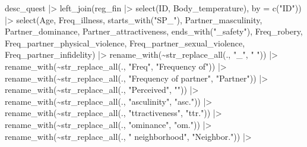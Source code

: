 \documentclass[
  bookmarksnumbered]{article}
\newenvironment{Shaded}{\begin{snugshade}}{\end{snugshade}}
\newcommand{\AttributeTok}[1]{\textcolor[rgb]{0.80,0.80,0.80}{#1}}
\newcommand{\FunctionTok}[1]{\textcolor[rgb]{0.94,0.94,0.56}{#1}}
\newcommand{\NormalTok}[1]{\textcolor[rgb]{0.80,0.80,0.80}{#1}}
\newcommand{\SpecialCharTok}[1]{\textcolor[rgb]{0.86,0.64,0.64}{#1}}
\newcommand{\StringTok}[1]{\textcolor[rgb]{0.80,0.58,0.58}{#1}}
\begin{document}
\begin{Shaded}
\begin{Highlighting}[]
\NormalTok{desc\_quest }\SpecialCharTok{|\textgreater{}} 
  \FunctionTok{left\_join}\NormalTok{(reg\_fin }\SpecialCharTok{|\textgreater{}} 
              \FunctionTok{select}\NormalTok{(ID, Body\_temperature), }
            \AttributeTok{by =} \FunctionTok{c}\NormalTok{(}\StringTok{"ID"}\NormalTok{)) }\SpecialCharTok{|\textgreater{}}
  \FunctionTok{select}\NormalTok{(Age,}
\NormalTok{         Freq\_illness,}
         \FunctionTok{starts\_with}\NormalTok{(}\StringTok{"SP\_"}\NormalTok{),}
\NormalTok{         Partner\_masculinity, Partner\_dominance, Partner\_attractiveness,}
         \FunctionTok{ends\_with}\NormalTok{(}\StringTok{"\_safety"}\NormalTok{), Freq\_robery,}
\NormalTok{         Freq\_partner\_physical\_violence, }
\NormalTok{         Freq\_partner\_sexual\_violence, }
\NormalTok{         Freq\_partner\_infidelity) }\SpecialCharTok{|\textgreater{}} 
  \FunctionTok{rename\_with}\NormalTok{(}\SpecialCharTok{\textasciitilde{}}\FunctionTok{str\_replace\_all}\NormalTok{(., }\StringTok{"\_"}\NormalTok{, }\StringTok{" "}\NormalTok{)) }\SpecialCharTok{|\textgreater{}} 
  \FunctionTok{rename\_with}\NormalTok{(}\SpecialCharTok{\textasciitilde{}}\FunctionTok{str\_replace\_all}\NormalTok{(., }\StringTok{"Freq"}\NormalTok{, }\StringTok{"Frequency of"}\NormalTok{)) }\SpecialCharTok{|\textgreater{}}
  \FunctionTok{rename\_with}\NormalTok{(}\SpecialCharTok{\textasciitilde{}}\FunctionTok{str\_replace\_all}\NormalTok{(., }\StringTok{"Frequency of partner"}\NormalTok{, }\StringTok{"Partner"}\NormalTok{)) }\SpecialCharTok{|\textgreater{}}
  \FunctionTok{rename\_with}\NormalTok{(}\SpecialCharTok{\textasciitilde{}}\FunctionTok{str\_replace\_all}\NormalTok{(., }\StringTok{"Perceived"}\NormalTok{, }\StringTok{""}\NormalTok{)) }\SpecialCharTok{|\textgreater{}}
  \FunctionTok{rename\_with}\NormalTok{(}\SpecialCharTok{\textasciitilde{}}\FunctionTok{str\_replace\_all}\NormalTok{(., }\StringTok{"asculinity"}\NormalTok{, }\StringTok{"asc."}\NormalTok{)) }\SpecialCharTok{|\textgreater{}}
  \FunctionTok{rename\_with}\NormalTok{(}\SpecialCharTok{\textasciitilde{}}\FunctionTok{str\_replace\_all}\NormalTok{(., }\StringTok{"ttractiveness"}\NormalTok{, }\StringTok{"ttr."}\NormalTok{)) }\SpecialCharTok{|\textgreater{}}
  \FunctionTok{rename\_with}\NormalTok{(}\SpecialCharTok{\textasciitilde{}}\FunctionTok{str\_replace\_all}\NormalTok{(., }\StringTok{"ominance"}\NormalTok{, }\StringTok{"om."}\NormalTok{)) }\SpecialCharTok{|\textgreater{}}
  \FunctionTok{rename\_with}\NormalTok{(}\SpecialCharTok{\textasciitilde{}}\FunctionTok{str\_replace\_all}\NormalTok{(., }\StringTok{" neighborhood"}\NormalTok{, }\StringTok{"Neighbor."}\NormalTok{)) }\SpecialCharTok{|\textgreater{}}

\end{Highlighting}
\end{Shaded}
\end{document}
